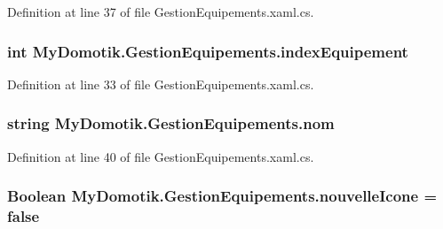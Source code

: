 Definition at line 37 of file Gestion\+Equipements.\+xaml.\+cs.

\subsubsection[{\texorpdfstring{index\+Equipement}{indexEquipement}}]{\setlength{\rightskip}{0pt plus 5cm}int My\+Domotik.\+Gestion\+Equipements.\+index\+Equipement\hspace{0.3cm}{\ttfamily [private]}}\hypertarget{class_my_domotik_1_1_gestion_equipements_a97158e3ed7c64a65cd0c4b622ba1e859}{}\label{class_my_domotik_1_1_gestion_equipements_a97158e3ed7c64a65cd0c4b622ba1e859}


Definition at line 33 of file Gestion\+Equipements.\+xaml.\+cs.

\subsubsection[{\texorpdfstring{nom}{nom}}]{\setlength{\rightskip}{0pt plus 5cm}string My\+Domotik.\+Gestion\+Equipements.\+nom\hspace{0.3cm}{\ttfamily [private]}}\hypertarget{class_my_domotik_1_1_gestion_equipements_a02ac90d607b1f1e7df10e2cf35341526}{}\label{class_my_domotik_1_1_gestion_equipements_a02ac90d607b1f1e7df10e2cf35341526}


Definition at line 40 of file Gestion\+Equipements.\+xaml.\+cs.

\subsubsection[{\texorpdfstring{nouvelle\+Icone}{nouvelleIcone}}]{\setlength{\rightskip}{0pt plus 5cm}Boolean My\+Domotik.\+Gestion\+Equipements.\+nouvelle\+Icone = false\hspace{0.3cm}{\ttfamily [private]}}\hypertarget{class_my_domotik_1_1_gestion_equipements_ad45240c0362eff36ba4a8ac65cc654c2}{}\label{class_my_domotik_1_1_gestion_equipements_ad45240c0362eff36ba4a8ac65cc654c2}


